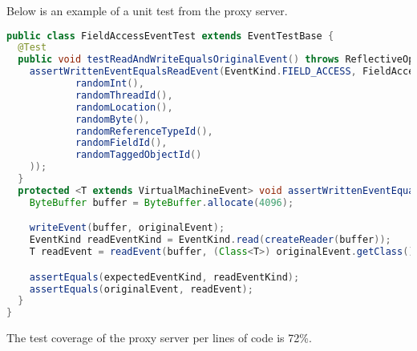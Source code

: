 \documentclass[..thesis.tex]{subfiles}
\begin{document}
Below is an example of a unit test from the proxy server.

\clearpage

\begin{lstlisting}[language=Java]
public class FieldAccessEventTest extends EventTestBase {
  @Test
  public void testReadAndWriteEqualsOriginalEvent() throws ReflectiveOperationException {
    assertWrittenEventEqualsReadEvent(EventKind.FIELD_ACCESS, FieldAccessEvent.create(
            randomInt(),
            randomThreadId(),
            randomLocation(),
            randomByte(),
            randomReferenceTypeId(),
            randomFieldId(),
            randomTaggedObjectId()
    ));
  }
  protected <T extends VirtualMachineEvent> void assertWrittenEventEqualsReadEvent(EventKind expectedEventKind, T originalEvent) throws ReflectiveOperationException {
    ByteBuffer buffer = ByteBuffer.allocate(4096);

    writeEvent(buffer, originalEvent);
    EventKind readEventKind = EventKind.read(createReader(buffer));
    T readEvent = readEvent(buffer, (Class<T>) originalEvent.getClass());

    assertEquals(expectedEventKind, readEventKind);
    assertEquals(originalEvent, readEvent);
  }
}
\end{lstlisting}

The test coverage of the proxy server per lines of code is 72\%.
\end{document}
